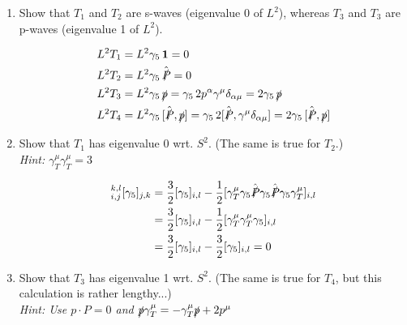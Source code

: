 \begin{enumerate}
	\item Show that $T_1$ and $T_2$ are s-waves (eigenvalue 0 of $L^2$), whereas $T_3$ and $T_3$ are p-waves (eigenvalue 1 of $L^2$).
	
	\begin{solution}
	\begin{align}
		L^2 T_1	&= L^2 \gamma_5\,\mathbf{1} = 0\\	
		L^2 T_2	&= L^2 \gamma_5\,\hat{\slashed{P}} = 0\\	
		L^2 T_3	&= L^2 \gamma_5\,    {\slashed{p}} = \gamma_5\, 2 p^\alpha \gamma^\mu \delta_{\alpha \mu} = 2 \gamma_5\,\slashed{p}\\
		L^2 T_4	&= L^2 \gamma_5\,[\hat{\slashed{P}} ,{\slashed{p}}] = \gamma_5\,2 [\hat{\slashed{P}} ,\gamma^\mu \delta_{\alpha \mu}] = 2 \gamma_5\,[\hat{\slashed{P}} ,{\slashed{p}}]
	\end{align}	
    \end{solution}

	\item Show that $T_1$ has eigenvalue 0 wrt. $S^2$. (The same is true for $T_2$.) \\
	{\em Hint: $\gamma_T^\mu  \gamma_T^\mu = 3$}
	
	\begin{solution}
	\begin{align}
		[S^2]_{i,j}^{k,l} [\gamma_5]_{j,k} &= \frac{3}{2} [\gamma_5]_{i,l} - \frac{1}{2} [\gamma_T^\mu \gamma_5 \hat{\slashed{P}}
		\gamma_5 \hat{\slashed{P}} \gamma_5  \gamma_T^\mu]_{i,l} \\
            &= \frac{3}{2} [\gamma_5]_{i,l} - \frac{1}{2} [\gamma_T^\mu  \gamma_T^\mu \gamma_5]_{i,l} \\
            &= \frac{3}{2} [\gamma_5]_{i,l} - \frac{3}{2} [\gamma_5]_{i,l} = 0 
        \end{align}	
    \end{solution}

	\item Show that $T_3$ has eigenvalue 1 wrt. $S^2$. 
	    (The same is true for $T_4$, but this calculation is rather lengthy...)\\
	{\em Hint: Use $p \cdot P = 0$ and $\slashed{p} \gamma_T^\mu  = -\gamma_T^\mu \slashed{p} + 2 p^\mu$}
	

\end{enumerate}
